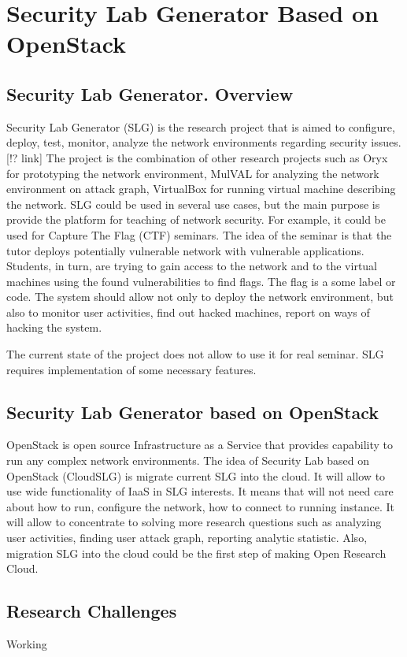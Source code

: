 %


\section{Security Lab Generator Based on OpenStack}

\subsection{Security Lab Generator. Overview}

Security Lab Generator (SLG) is the research project that is aimed to configure, deploy, test, monitor, analyze the network environments regarding security issues. [!? link] The project is the combination of other research projects such as Oryx for prototyping the network environment, MulVAL for analyzing the network environment on attack graph, VirtualBox for running virtual machine describing the network. SLG could be used in several use cases, but the main purpose is provide the platform for teaching of network security. For example, it could be used for Capture The Flag (CTF) seminars. The idea of the seminar is that the tutor deploys potentially vulnerable network with vulnerable applications. Students, in turn, are trying to gain access to the network and to the virtual machines using the found vulnerabilities to find flags. The flag is a some label or code. The system should allow not only to deploy the network environment, but also to monitor user activities, find out hacked machines, report on ways of hacking the system. 

The current state of the project does not allow to use it for real seminar. SLG requires implementation of some necessary features. 


\subsection{Security Lab Generator based on OpenStack}
OpenStack is open source Infrastructure as a Service that provides capability to run any complex network environments. The idea of Security Lab based on OpenStack (CloudSLG) is migrate current SLG into the cloud. It will allow to use wide functionality of IaaS in SLG interests. It means that will not need care about how to run, configure the network, how to connect to running instance. It will allow to concentrate to solving more research questions such as analyzing user activities, finding user attack graph, reporting analytic statistic. Also, migration SLG into the cloud could be the first step of making Open Research Cloud.    


\subsection{Research Challenges}
Working 



% 